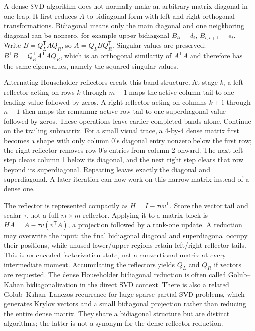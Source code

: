 A dense SVD algorithm does not normally make an arbitrary matrix diagonal in one leap. It first reduces \(A\) to bidiagonal form with left and right orthogonal transformations. Bidiagonal means only the main diagonal and one neighboring diagonal can be nonzero, for example upper bidiagonal \(B_{ii}=d_i\), \(B_{i,i+1}=e_i\). Write \(B=Q_L^\mathsf TAQ_R\), so \(A=Q_LBQ_R^\mathsf T\). Singular values are preserved: \(B^\mathsf TB=Q_R^\mathsf TA^\mathsf TAQ_R\), which is an orthogonal similarity of \(A^\mathsf TA\) and therefore has the same eigenvalues, namely the squared singular values.

Alternating Householder reflectors create this band structure. At stage \(k\), a left reflector acting on rows \(k\) through \(m-1\) maps the active column tail to one leading value followed by zeros. A right reflector acting on columns \(k+1\) through \(n-1\) then maps the remaining active row tail to one superdiagonal value followed by zeros. These operations leave earlier completed bands alone. Continue on the trailing submatrix. For a small visual trace, a 4-by-4 dense matrix first becomes a shape with only column 0's diagonal entry nonzero below the first row; the right reflector removes row 0's entries from column 2 onward. The next left step clears column 1 below its diagonal, and the next right step clears that row beyond its superdiagonal. Repeating leaves exactly the diagonal and superdiagonal. A later iteration can now work on this narrow matrix instead of a dense one.

The reflector is represented compactly as \(H=I-\tau vv^\mathsf T\). Store the vector tail and scalar \(\tau\), not a full \(m\times m\) reflector. Applying it to a matrix block is \(HA=A-\tau v(v^\mathsf TA)\), a projection followed by a rank-one update. A reduction may overwrite the input: the final bidiagonal diagonal and superdiagonal occupy their positions, while unused lower/upper regions retain left/right reflector tails. This is an encoded factorization state, not a conventional matrix at every intermediate moment. Accumulating the reflectors yields \(Q_L\) and \(Q_R\) if vectors are requested. The dense Householder bidiagonal reduction is often called Golub--Kahan bidiagonalization in the direct SVD context. There is also a related Golub--Kahan--Lanczos recurrence for large sparse partial-SVD problems, which generates Krylov vectors and a small bidiagonal projection rather than reducing the entire dense matrix. They share a bidiagonal structure but are distinct algorithms; the latter is not a synonym for the dense reflector reduction.


